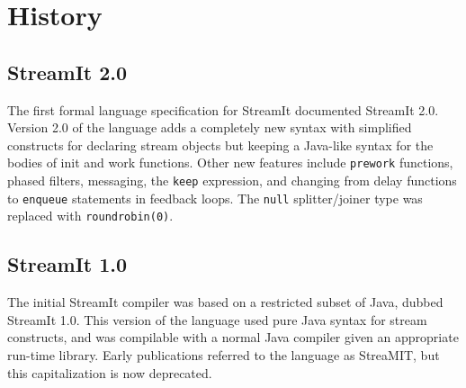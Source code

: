 \documentclass[11pt]{article}
\begin{document}
\section{History}

\subsection{StreamIt 2.0}

The first formal language specification for StreamIt documented
StreamIt 2.0.  Version 2.0 of the language adds a completely new
syntax with simplified constructs for declaring stream objects but
keeping a Java-like syntax for the bodies of init and work functions.
Other new features include \lstinline|prework| functions, phased
filters, messaging, the \lstinline|keep| expression, and changing from
delay functions to \lstinline|enqueue| statements in feedback loops.
The \lstinline|null| splitter/joiner type was replaced with
\lstinline|roundrobin(0)|.

\subsection{StreamIt 1.0}

The initial StreamIt compiler was based on a restricted subset of
Java, dubbed StreamIt 1.0.  This version of the language used pure
Java syntax for stream constructs, and was compilable with a normal
Java compiler given an appropriate run-time library.  Early
publications referred to the language as StreaMIT, but this
capitalization is now deprecated.
\end{document}
